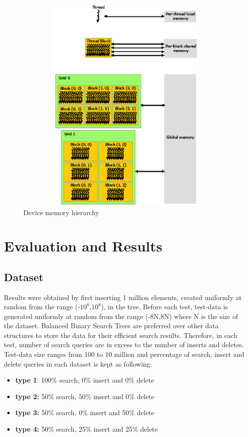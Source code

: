 \documentclass[MTech]{iitmdiss}
\begin{document}
\begin{figure}
\centering
\includegraphics[width= 12cm, height= 11cm]{memory_hierarchy}
\caption{Device memory hierarchy}
\label{fig:memory_hierarchy}
\end{figure}

\chapter{Evaluation and Results}
\label{chap:results}
\section{Dataset}
Results were obtained by first inserting 1 million elements, created uniformly at random from the range (-$10^{8}$,$10^{8}$), in the tree. 
Before each test, test-data is generated uniformly at random from the range (-8N,8N) where N is the size of the dataset. Balanced Binary Search Trees are preferred over other data structures to store the data for their efficient search results. Therefore, in each test, number of search queries are in excess to the number of inserts and deletes. Test-data size ranges from 100 to 10 million and percentage of search, insert and delete queries in each dataset is kept as following:
\begin{itemize}
\item \textbf{type 1}: 100\% search, 0\% insert and 0\% delete
\item \textbf{type 2:} 50\% search, 50\% insert and 0\% delete
\item \textbf{type 3:} 50\% search, 0\% insert and 50\% delete
\item \textbf{type 4:} 50\% search, 25\% insert and 25\% delete
\end{itemize}
\end{document}
